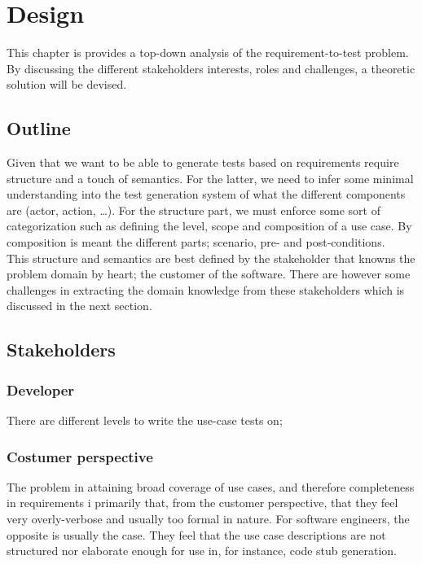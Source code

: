 
\chapter{Design}
This chapter is provides a top-down analysis of the requirement-to-test problem. By discussing the different stakeholders interests, roles and challenges, a theoretic solution will be devised.

\section{Outline}
Given that we want to be able to generate tests based on requirements require structure and a touch of semantics. For the latter, we need to infer some minimal understanding into the test generation system of what the different components are (actor, action, \dots). For the structure part, we must enforce some sort of categorization such as defining the level, scope and composition of a use case. By composition is meant the different parts; scenario, pre- and post-conditions.\\
This structure and semantics are best defined by the stakeholder that knowns the problem domain by heart; the customer of the software. There are however some challenges in extracting the domain knowledge from these stakeholders which is discussed in the next section.

\section{Stakeholders}

\subsection{Developer}
There are different levels to write the use-case tests on;

\subsection{Costumer perspective}
The problem in attaining broad coverage of use cases, and therefore completeness in requirements i primarily that, from the customer perspective, that they feel very overly-verbose and usually too formal in nature. For software engineers, the opposite is usually the case. They feel that the use case descriptions are not structured nor elaborate enough for use in, for instance, code stub generation.

